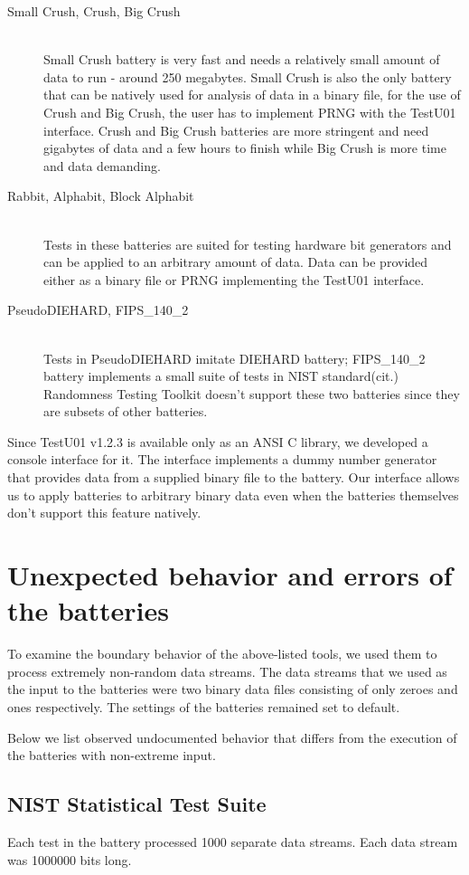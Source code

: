 \documentclass[
  digital,  	%
  color,		%
  oneside,   	%
  12pt,
  nocover,
  notable,
  nolof,
  nolot,
]{fithesis3}
\theoremstyle{definition}
\theoremstyle{remark}
\begin{document}
\begin{description}
\item[Small Crush, Crush, Big Crush] \hfill \\
Small Crush battery is very fast and needs a relatively small amount of data to run - around 250 megabytes. Small Crush is also the only battery that can be natively used for analysis of data in a binary file, for the use of Crush and Big Crush, the user has to implement PRNG with the TestU01 interface. Crush and Big Crush batteries are more stringent and need gigabytes of data and a few hours to finish while Big Crush is more time and data demanding.
\item[Rabbit, Alphabit, Block Alphabit] \hfill \\
Tests in these batteries are suited for testing hardware bit generators and can be applied to an arbitrary amount of data. Data can be provided either as a binary file or PRNG implementing the TestU01 interface.
\item[PseudoDIEHARD, FIPS\_140\_2] \hfill \\
Tests in PseudoDIEHARD imitate DIEHARD battery; FIPS\_140\_2 battery implements a small suite of tests in NIST standard(cit.) Randomness Testing Toolkit doesn't support these two batteries since they are subsets of other batteries.
\end{description}

Since TestU01 v1.2.3 is available only as an ANSI C library, we developed a console interface for it. The interface implements a dummy number generator that provides data from a supplied binary file to the battery. Our interface allows us to apply batteries to arbitrary binary data even when the batteries themselves don't support this feature natively.

\section{Unexpected behavior and errors of the batteries}
To examine the boundary behavior of the above-listed tools, we used them to process extremely non-random data streams. The data streams that we used as the input to the batteries were two binary data files consisting of only zeroes and ones respectively. The settings of the batteries remained set to default. 

Below we list observed undocumented behavior that differs from the execution of the batteries with non-extreme input.

\subsection*{NIST Statistical Test Suite}
Each test in the battery processed 1000 separate data streams. Each data stream was 1000000 bits long.
\end{document}
